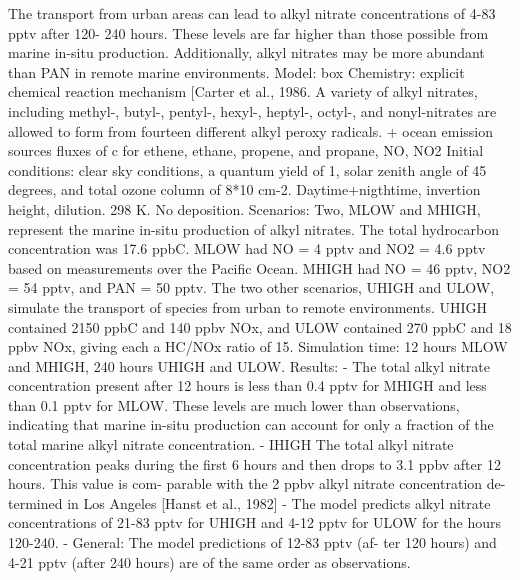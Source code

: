 \documentclass[11pt,a4paper]{article}
\begin{document}
\citep{Atherton1989}
The transport from urban areas can lead to alkyl nitrate concentrations of 4-83 pptv after 120- 240 hours. These levels are far higher than those possible from marine in-situ production. Additionally, alkyl nitrates may be more abundant than PAN in remote marine environments.
Model: box
Chemistry: explicit chemical reaction mechanism
[Carter et al., 1986. A variety of alkyl nitrates, including methyl-, butyl-, pentyl-, hexyl-, heptyl-, octyl-, and nonyl-nitrates are allowed to form from fourteen different alkyl peroxy radicals. + ocean emission sources fluxes of c
for ethene, ethane, propene, and propane, NO, NO2
Initial conditions: clear sky conditions, a quantum yield of 1, solar zenith angle of 45 degrees, and total ozone column of 8*10 cm-2. Daytime+nigthtime, invertion height, dilution. 298 K. No deposition.
Scenarios: Two, MLOW and MHIGH, represent the marine in-situ production of alkyl nitrates. The total hydrocarbon concentration was 17.6 ppbC. MLOW had NO = 4 pptv and NO2 = 4.6 pptv based on measurements over the Pacific Ocean. MHIGH had NO = 46 pptv, NO2 = 54 pptv, and PAN = 50 pptv. The two other scenarios, UHIGH and ULOW, simulate the transport of species from urban to remote environments. UHIGH contained 2150 ppbC and 140 ppbv NOx, and ULOW contained 270 ppbC and 18 ppbv NOx, giving each a HC/NOx ratio of 15.
Simulation time: 12 hours MLOW and MHIGH, 240 hours UHIGH and ULOW.
Results:
- The total alkyl nitrate concentration present after 12 hours is less than 0.4 pptv for MHIGH and less than 0.1 pptv for MLOW. These levels are much lower than observations, indicating that marine in-situ production can account for only a fraction of the total marine alkyl nitrate concentration.
- IHIGH The total alkyl nitrate concentration peaks during the first 6 hours and then drops to 3.1 ppbv after 12 hours. This value is com- parable with the 2 ppbv alkyl nitrate concentration de- termined in Los Angeles [Hanst et al., 1982]
- The model predicts alkyl nitrate concentrations of 21-83 pptv for UHIGH and 4-12 pptv for ULOW for the hours 120-240.
- General: The model predictions of 12-83 pptv (af- ter 120 hours) and 4-21 pptv (after 240 hours) are of the same order as observations.
\end{document}
